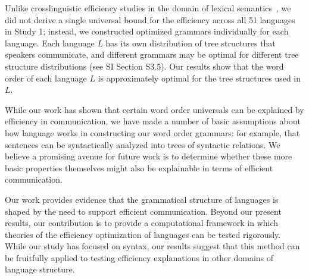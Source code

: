 \documentclass[9pt,twocolumn,twoside,lineno]{pnas-new}
\begin{document}
Unlike crosslinguistic efficiency studies in the domain of lexical semantics~\cite{kemp2012kinship,regier2015word,zaslavsky2018efficient}, we did not derive a single universal bound for the efficiency across all 51 languages in Study 1; instead, we constructed optimized grammars individually for each language.
Each language $L$ has its own distribution of tree structures that speakers communicate, and different grammars may be optimal for different tree structure distributions (see SI Section S3.5).
Our results show that the word order of each language $L$ is approximately optimal for the tree structures used in $L$.

While our work has shown that certain word order universals can be explained by efficiency in communication, we have made a number of basic assumptions about how language works in constructing our word order grammars: for example, that sentences can be syntactically analyzed into trees of syntactic relations. We believe a promising avenue for future work is to determine whether these more basic properties themselves might also be explainable in terms of efficient communication.

Our work provides evidence that the grammatical structure of languages is shaped by the need to support efficient communication.
Beyond our present results, our contribution is to provide a computational framework in which theories of the efficiency optimization of languages can be tested rigorously.
While our study has focused on syntax, our results suggest that this method can be fruitfully applied to testing efficiency explanations in other domains of language structure.
\end{document}
